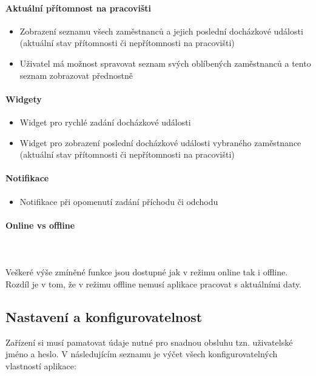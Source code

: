 \documentclass{diplomka}
\begin{document}
\newpage
\paragraph{Aktuální přítomnost na pracovišti}
\begin{itemize}[noitemsep,nolistsep]
\item Zobrazení seznamu všech zaměstnanců a jejich poslední docházkové události  (aktuální stav přítomnosti či nepřítomnosti na pracovišti)
\item Uživatel má možnost spravovat seznam svých oblíbených zaměstnanců a tento seznam zobrazovat přednostně
\end{itemize}

\paragraph{Widgety}
\begin{itemize}[noitemsep,nolistsep]
\item Widget pro rychlé zadání docházkové události
\item Widget pro zobrazení poslední docházkové události vybraného zaměstnance (aktuální stav přítomnosti či nepřítomnosti na pracovišti)
\end{itemize}

\paragraph{Notifikace}
\begin{itemize}[noitemsep,nolistsep]
\item Notifikace při opomenutí zadání příchodu či odchodu
\end{itemize}

\paragraph{Online vs offline}\mbox{}\\ \\ \indent
Veškeré výše zmíněné funkce jsou dostupné jak v režimu online tak i offline. Rozdíl je v tom, že v režimu offline nemusí aplikace pracovat s aktuálními daty.

\subsection{Nastavení a konfigurovatelnost}
Zařízení si musí pamatovat údaje nutné pro snadnou obsluhu tzn. uživatelské jméno a heslo. V následujícím seznamu je výčet všech konfigurovatelných vlastností aplikace:
\end{document}
